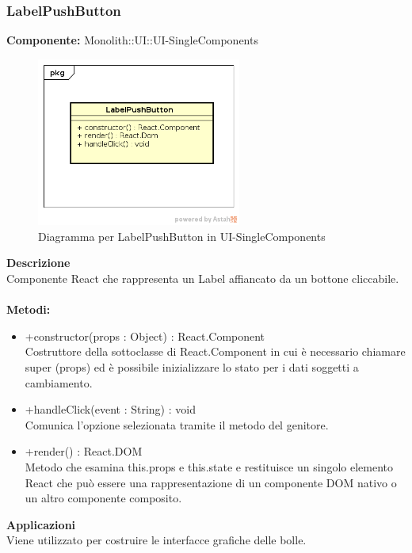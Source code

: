 \clearpage

\subsubsection{LabelPushButton}
\textbf{Componente:}  Monolith::UI::UI-SingleComponents\\
   \FloatBarrier
   \begin{figure}[ht]
   \centering
   \includegraphics[width=0.6\textwidth]{img/single-LabelPushButton}
   \caption{{Diagramma per LabelPushButton in UI-SingleComponents}}
\end{figure}
\FloatBarrier
\textbf{Descrizione}\\
Componente React che rappresenta un Label affiancato da un bottone cliccabile. \\\\
\textbf{Metodi:} \begin{itemize}\item +constructor(props : Object) : React.Component \\Costruttore della sottoclasse di React.Component in cui è necessario chiamare super (props) ed è possibile inizializzare lo stato per i dati soggetti a cambiamento.\item +handleClick(event : String) : void  \\Comunica l’opzione selezionata tramite il metodo del genitore.\item +render() : React.DOM \\Metodo che esamina this.props e this.state e restituisce un singolo elemento React che può essere una rappresentazione di un componente DOM nativo o un altro componente composito.\end{itemize} 


\textbf{Applicazioni}\\
Viene utilizzato per costruire le interfacce grafiche delle bolle. 


